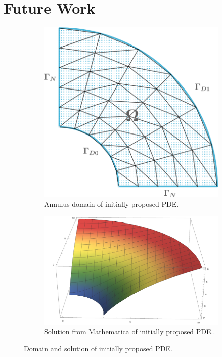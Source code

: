 \section{Future Work}

\begin{figure}
	\centering
	\begin{subfigure}{0.35\linewidth}
		\centering
		\includegraphics[width = \linewidth]{Figures/annulus}
		\caption{Annulus domain of initially proposed PDE.}
		\label{fig:annul_dom}
	\end{subfigure}\hfill
	\begin{subfigure}{0.53\linewidth}
		\centering
		\includegraphics[width=\linewidth]{Figures/annul}
		\caption{Solution from Mathematica of initially proposed PDE..}
		\label{fig:annul_sols}
	\end{subfigure}
	\caption{Domain and solution of initially proposed PDE.}
	\label{fig:init_pde}
\end{figure}

